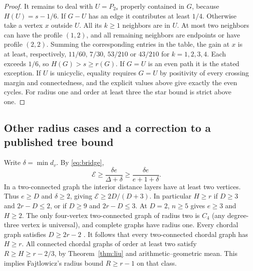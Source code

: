 \documentclass[11pt,a4paper]{article}
\newcommand{\gap}{\mathcal{E}}
\begin{document}
\begin{proof}
It remains to deal with $U=P_{2s}$ properly contained in $G$, because
$H(U)=s-1/6$. If $G-U$ has an edge it contributes at least $1/4$.
Otherwise take a vertex $x$ outside $U$. All its $k\ge1$ neighbors are in
$U$. At most two neighbors can have the profile $(1,2)$, and all remaining
neighbors are endpoints or have profile $(2,2)$. Summing the corresponding
entries in the table, the gain at $x$ is at least, respectively,
$11/60$, $7/30$, $53/210$ or $43/210$ for $k=1,2,3,4$.
Each exceeds $1/6$, so $H(G)>s\ge r(G)$. If $G=U$ is an even path it is
the stated exception. If $U$ is unicyclic, equality requires $G=U$
by positivity of every crossing margin and connectedness, and the explicit values above give exactly the even cycles. For radius one
and order at least three the star bound is strict above one.
\end{proof}

\subsection*{Other radius cases and a correction to a published tree bound}
Write $\delta=\min d_v$. By \eqref{eq:bridge},
\[
 \gap\ge\frac{\delta e}{\Delta+\delta}\ge\frac{\delta e}{e+1+\delta}.
\]
In a two-connected graph the interior distance layers have at least two vertices. Thus $e\ge D$ and $\delta\ge2$, giving $\gap\ge2D/(D+3)$. In particular $H\ge r$ if $D\ge3$ and $2r-D\le2$, or if $D\ge9$ and $2r-D\le3$. At $D=2$, $n\ge5$ gives $e\ge3$ and $H\ge2$. The only four-vertex two-connected graph of radius two is $C_4$ (any degree-three vertex is universal), and complete graphs have radius one. Every chordal graph satisfies $D\ge2r-2$ \cite[Thm.~1]{chordal}. It follows that every two-connected chordal graph has $H\ge r$. All connected chordal graphs of order at least two satisfy $R\ge H\ge r-2/3$, by Theorem~\ref{thm:liu} and arithmetic--geometric mean. This implies Fajtlowicz's radius bound $R\ge r-1$ on that class.
\end{document}

